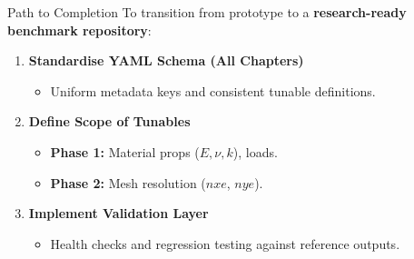 \documentclass[aspectratio=169]{beamer}
\begin{document}
\begin{frame}{Path to Completion}
    To transition from prototype to a \textbf{research-ready benchmark repository}:

    \vspace{0.3cm}
    \begin{enumerate}
        \setlength\itemsep{0.5em}
        \item \textbf{Standardise YAML Schema (All Chapters)}
        \begin{itemize}
            \item Uniform metadata keys and consistent tunable definitions.
        \end{itemize}
        \item \textbf{Define Scope of Tunables}
        \begin{itemize}
            \item \textbf{Phase 1:} Material props ($E, \nu, k$), loads.
            \item \textbf{Phase 2:} Mesh resolution ($nxe$, $nye$).
        \end{itemize}
        \item \textbf{Implement Validation Layer}
        \begin{itemize}
            \item Health checks and regression testing against reference outputs.
        \end{itemize}
    \end{enumerate}
\end{frame}

\end{document}
